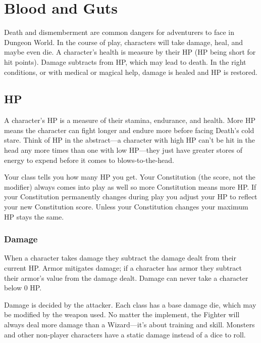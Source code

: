 \chapter{Blood and Guts}
   
            

Death and dismemberment are common dangers for adventurers to face in Dungeon World. In the course of play, characters will take damage, heal, and maybe even die. A character's health is measure by their HP (HP being short for hit points). Damage subtracts from HP, which may lead to death. In the right conditions, or with medical or magical help, damage is healed and HP is restored.

       
\section{HP}   
       

A character's HP is a measure of their stamina, endurance, and health. More HP means the character can fight longer and endure more before facing Death's cold stare. Think of HP in the abstract—a character with high HP can't be hit in the head any more times than one with low HP—they just have greater stores of energy to expend before it comes to blows-to-the-head.

       

Your class tells you how many HP you get. Your Constitution (the score, not the modifier) always comes into play as well so more Constitution means more HP. If your Constitution permanently changes during play you adjust your HP to reflect your new Constitution score. Unless your Constitution changes your maximum HP stays the same.

       
\subsection{Damage}   
       

When a character takes damage they subtract the damage dealt from their current HP. Armor mitigates damage; if a character has armor they subtract their armor's value from the damage dealt. Damage can never take a character below 0 HP.

       

Damage is decided by the attacker. Each class has a base damage die, which may be modified by the weapon used. No matter the implement, the Fighter will always deal more damage than a Wizard—it's about training and skill. Monsters and other non-player characters have a static damage instead of a dice to roll.

